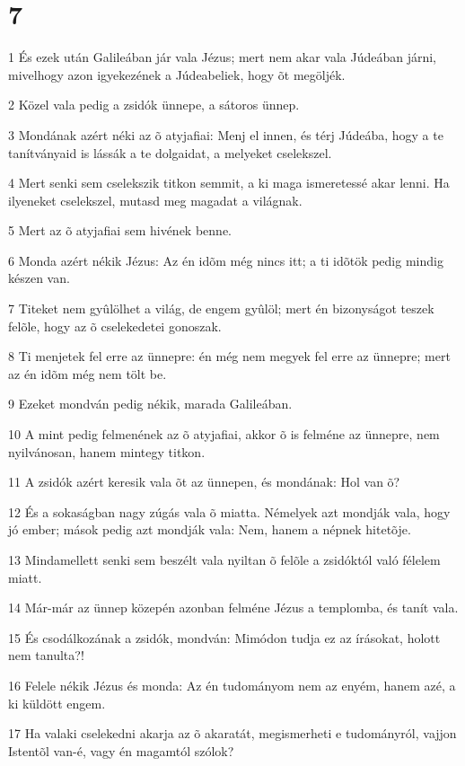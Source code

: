 \chapter{7}

\par 1 És ezek után Galileában jár vala Jézus; mert nem akar vala Júdeában járni, mivelhogy azon igyekezének a Júdeabeliek, hogy õt megöljék.
\par 2 Közel vala pedig a zsidók ünnepe, a sátoros ünnep.
\par 3 Mondának azért néki az õ atyjafiai: Menj el innen, és térj Júdeába, hogy a te tanítványaid is lássák a te dolgaidat, a melyeket cselekszel.
\par 4 Mert senki sem cselekszik titkon semmit, a ki maga ismeretessé akar lenni. Ha ilyeneket cselekszel, mutasd meg magadat a világnak.
\par 5 Mert az õ atyjafiai sem hivének benne.
\par 6 Monda azért nékik Jézus: Az én idõm még nincs itt; a ti idõtök pedig mindig készen van.
\par 7 Titeket nem gyûlölhet a világ, de engem gyûlöl; mert én bizonyságot teszek felõle, hogy az õ  cselekedetei gonoszak.
\par 8 Ti menjetek fel erre az ünnepre: én még nem megyek fel erre az ünnepre; mert az én idõm még nem tölt be.
\par 9 Ezeket mondván pedig nékik, marada Galileában.
\par 10 A mint pedig felmenének az õ atyjafiai, akkor õ is felméne az ünnepre, nem nyilvánosan, hanem mintegy titkon.
\par 11 A zsidók azért keresik vala õt az ünnepen, és mondának: Hol van õ?
\par 12 És a sokaságban nagy zúgás vala õ miatta. Némelyek azt mondják vala, hogy jó ember; mások pedig azt mondják vala: Nem, hanem a népnek hitetõje.
\par 13 Mindamellett senki sem beszélt vala nyiltan õ felõle a zsidóktól való félelem miatt.
\par 14 Már-már az ünnep közepén azonban felméne Jézus a templomba, és tanít vala.
\par 15 És csodálkozának a zsidók, mondván: Mimódon tudja ez az írásokat, holott nem tanulta?!
\par 16 Felele nékik Jézus és monda: Az én tudományom nem az enyém, hanem azé, a ki küldött engem.
\par 17 Ha valaki cselekedni akarja az õ akaratát, megismerheti e tudományról, vajjon Istentõl van-é, vagy én magamtól szólok?
